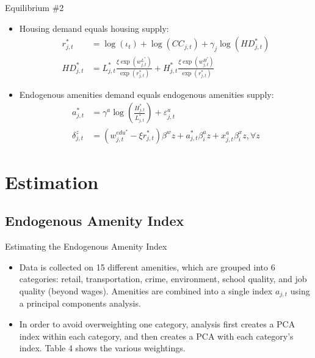 \documentclass[aspectratio=169]{beamer}
\begin{document}
\begin{frame}{Equilibrium \#2}

\begin{itemize}
    \item<1-> Housing demand equals housing supply:
    \begin{equation*}
        \begin{split}
            r_{j,t}^{*} &= \log\left( \iota_t \right) + \log\left( CC_{j,t} \right) + \gamma_{j} \log\left( HD_{j,t}^{*} \right) \\
            HD_{j,t}^{*} &= L_{j,t}^{*} \frac{\xi \exp\left( w_{j,t}^{L^*} \right)}{\exp\left( r_{j,t}^{*} \right)} + H_{j,t}^{*} \frac{\xi \exp\left( w_{j,t}^{H^*} \right)}{\exp\left( r_{j,t}^{*} \right)}
        \end{split}
    \end{equation*}
    \item<2-> Endogenous amenities demand equals endogenous amenities supply:
    \begin{equation*}
        \begin{split}
            a_{j,t}^{*} &= \gamma^{a} \log\left( \frac{H_{j,t}^{*}}{L_{j,t}^{*}} \right) + \varepsilon_{j,t}^{a} \\
            \delta_{j,t}^{z} &= \left( w_{j,t}^{edu^*} - \xi r_{j,t}^{*} \right) \beta^{w} z + a_{j,t}^{*} \beta_{i}^{a} z + x_{j,t}^{a} \beta_{i}^{x} z, \forall z
        \end{split}
    \end{equation*}
\end{itemize}

\end{frame}


\section{Estimation}

\subsection{Endogenous Amenity Index}


\begin{frame}{Estimating the Endogenous Amenity Index}

\begin{itemize}
    \item<1-> Data is collected on 15 different amenities, which are grouped into 6 categories: retail, transportation, crime, environment, school quality, and job quality (beyond wages).  Amenities are combined into a single index $ a_{j,t} $ using a principal components analysis.
    \item<2->  In order to avoid overweighting one category, analysis first creates a PCA index within each category, and then creates a PCA with each category’s index.  Table 4 shows the various weightings.
\end{itemize}
    
\end{frame}
\end{document}
